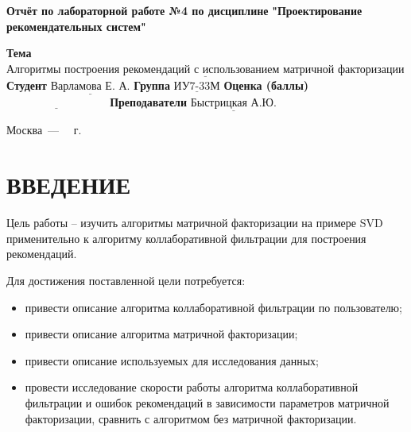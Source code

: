 \documentclass[12pt]{report}
\begin{document}
\begin{titlepage}
	
	\begin{center}
		\noindent\begin{minipage}{1.3\textwidth}\centering
			\Large\textbf{  Отчёт по лабораторной работе №4 по дисциплине}\newline
			\textbf{ "Проектирование рекомендательных систем"}\newline\newline
		\end{minipage}
	\end{center}
	
	\noindent\textbf{Тема} $\underline{\text{Алгоритмы построения рекомендаций с использованием матричной факторизации}}$\newline\newline
	\noindent\textbf{Студент} $\underline{\text{Варламова Е. А.}}$\newline\newline
	\noindent\textbf{Группа} $\underline{\text{ИУ7-33М}}$\newline\newline
	\noindent\textbf{Оценка (баллы)} $\underline{\text{~~~~~~~~~~~~~~~~~~~~~~~~~~~}}$\newline\newline
	\noindent\textbf{Преподаватели} $\underline{\text{Быстрицкая А.Ю.}}$\newline\newline\newline
	
	\begin{center}
		\vfill
		Москва~---~\the\year
		~г.
	\end{center}
\end{titlepage}
\large
\setcounter{page}{2}
\def\contentsname{СОДЕРЖАНИЕ}
\renewcommand{\contentsname}{СОДЕРЖАНИЕ}
\tableofcontents
\renewcommand\labelitemi{---}
\newpage

\chapter*{ВВЕДЕНИЕ}

Цель работы -- изучить алгоритмы матричной факторизации на примере SVD применительно к алгоритму коллаборативной фильтрации для построения рекомендаций.

Для достижения поставленной цели потребуется:
\begin{itemize}
	\item привести описание алгоритма коллаборативной фильтрации по пользователю;
    \item привести описание алгоритма матричной факторизации;
	\item привести описание используемых для исследования данных;
	\item провести исследование скорости работы алгоритма коллаборативной фильтрации и ошибок рекомендаций в зависимости параметров матричной факторизации, сравнить с алгоритмом без матричной факторизации.
\end{itemize}
\end{document}
